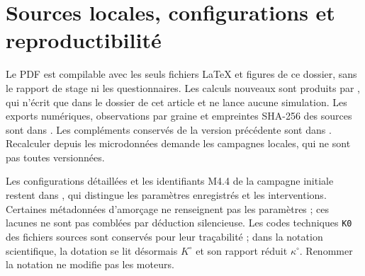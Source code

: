 \section{Sources locales, configurations et reproductibilité}\label{sec:sources_revision}
Le PDF est compilable avec les seuls fichiers LaTeX et figures
de ce dossier, sans le rapport de stage ni les questionnaires.
Les calculs nouveaux sont produits par
, qui n'écrit que dans
le dossier de cet article et ne lance aucune simulation.
Les exports numériques, observations par graine et empreintes
SHA-256 des sources sont dans .
Les compléments conservés de la version précédente sont dans
. Recalculer depuis les microdonnées
demande les campagnes locales, qui ne sont pas toutes versionnées.

\onecolumn

\twocolumn

Les configurations détaillées et les identifiants M4.4 de la
campagne initiale restent dans
, qui distingue les paramètres
enregistrés et les interventions. Certaines métadonnées d'amorçage
ne renseignent pas les paramètres ; ces lacunes ne sont pas comblées
par déduction silencieuse.
Les codes techniques \texttt{K0} des fichiers sources sont
conservés pour leur traçabilité ; dans la notation scientifique,
la dotation se lit désormais $K^\circ$ et son rapport réduit
$\kappa^\circ$. Renommer la notation ne modifie pas les moteurs.


